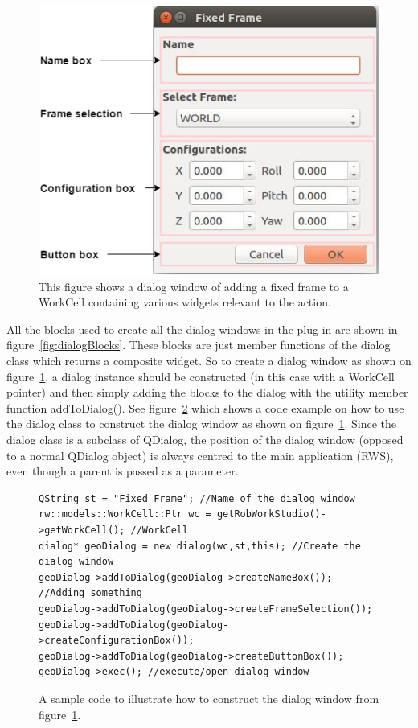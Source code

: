 \begin{figure}[h]
	\centering
	\includegraphics[scale=0.55]{Figures/dialogclassblocks.png}
	\caption{This figure shows a dialog window of adding a fixed frame to a WorkCell containing various widgets relevant to the action. }
	\label{fig:dialogWindowExample}
\end{figure}

All the blocks used to create all the dialog windows in the plug-in are shown in figure~\ref{fig:dialogBlocks}. These blocks are just member functions of the dialog class which returns a composite widget. So to create a dialog window as shown on figure~\ref{fig:dialogWindowExample}, a dialog instance should be constructed (in this case with a WorkCell pointer) and then simply adding the blocks to the dialog with the utility member function addToDialog(). See figure~\ref{fig:dialogWindowCode} which shows a code example on how to use the dialog class to construct the dialog window as shown on figure~\ref{fig:dialogWindowExample}. Since the dialog class is a subclass of QDialog, the position of the dialog window (opposed to a normal QDialog object) is always centred to the main application (RWS), even though a parent is passed as a parameter.

\begin{figure}[h] %
\centering
\lstset{language=C++} 
\begin{lstlisting}[frame=single]  
QString st = "Fixed Frame"; //Name of the dialog window
rw::models::WorkCell::Ptr wc = getRobWorkStudio()->getWorkCell(); //WorkCell
dialog* geoDialog = new dialog(wc,st,this); //Create the dialog window
geoDialog->addToDialog(geoDialog->createNameBox()); //Adding something
geoDialog->addToDialog(geoDialog->createFrameSelection());
geoDialog->addToDialog(geoDialog->createConfigurationBox());
geoDialog->addToDialog(geoDialog->createButtonBox());	
geoDialog->exec(); //execute/open dialog window	 
\end{lstlisting}
\caption{A sample code to illustrate how to construct the dialog window from figure~\ref{fig:dialogWindowExample}.}
\label{fig:dialogWindowCode} 	
\end{figure}

